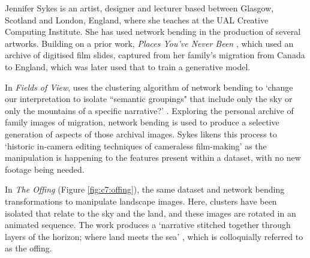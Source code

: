 Jennifer Sykes is an artist, designer and lecturer based between Glasgow, Scotland and London, England, where she teaches at the UAL Creative Computing Institute.
She has used network bending in the production of several artworks. Building on a prior work, \textit{Places You’ve Never Been} \citep{sykes2018places}, which used an archive of digitised film slides, captured from her family's migration from Canada to England, which was later used that to train a generative model. 

In \textit{Fields of View}, uses the clustering algorithm of network bending to `change our interpretation to isolate “semantic groupings" that include only the sky or only the mountains of a specific narrative?' \citep{sykes2021fields}. 
Exploring the personal archive of family images of migration, network bending is used to produce a selective generation of aspects of those archival images. 
Sykes likens this process to `historic in-camera editing techniques of cameraless film-making' \citep{sykes2021fields} as the manipulation is happening to the features present within a dataset, with no new footage being needed.

In \textit{The Offing} (Figure \ref{fig:c7:offing}), the same dataset and network bending transformations to manipulate landscape images. 
Here, clusters have been isolated that relate to the sky and the land, and these images are rotated in an animated sequence. 
The work produces a `narrative stitched together through layers of the horizon; where land meets the sea'  \cite{sykes2022offing}, which is colloquially referred to as the offing. 

